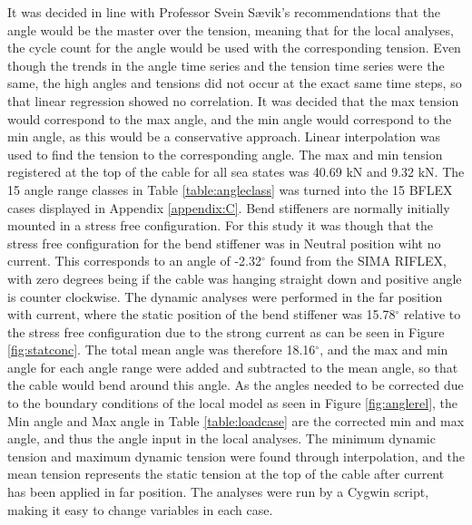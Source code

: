 \noindent It was decided in line with Professor Svein Sævik's recommendations that the angle would be the master over the tension, meaning that for the local analyses, the cycle count for the angle would be used with the corresponding tension. Even though the trends in the angle time series and the tension time series were the same, the high angles and tensions did not occur at the exact same time steps, so that linear regression showed no correlation. It was decided that the max tension would correspond to the max angle, and the min angle would correspond to the min angle, as this would be a conservative approach.  Linear interpolation was used to find the tension to the corresponding angle. The max and min tension registered at the top of the cable for all sea states was 40.69 kN and 9.32 kN. \newline
\newline
\noindent The 15 angle range classes in Table \ref{table:angleclass} was turned into the 15 BFLEX cases displayed in Appendix \ref{appendix:C}. Bend stiffeners are normally initially mounted in a stress free configuration. For this study it was though that the stress free configuration for the bend stiffener was in Neutral position wiht no current. This corresponds to an angle of -2.32$^\circ$ found from the SIMA RIFLEX, with zero degrees being if the cable was hanging straight down and positive angle is counter clockwise. The dynamic analyses were performed in the far position with current, where the static position of the bend stiffener was 15.78$^\circ$ relative to the stress free configuration due to the strong current as can be seen in Figure \ref{fig:statconc}. The total mean angle was therefore 18.16$^\circ$, and the max and min angle for each angle range were added and subtracted to the mean angle, so that the cable would bend around this angle. As the angles needed to be corrected due to the boundary conditions of the local model as seen in Figure \ref{fig:anglerel}, the Min angle and Max angle in Table \ref{table:loadcase} are the corrected min and max angle, and thus the angle input in the local analyses. The minimum dynamic tension and maximum dynamic tension were found through interpolation, and the mean tension represents the static tension at the top of the cable after current has been applied in far position. The analyses were run by a Cygwin script, making it easy to change variables in each case. 


